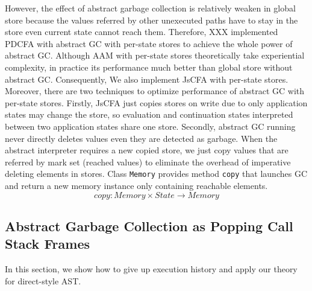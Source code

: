 \documentclass{article}
\begin{document}
However, the effect of abstract garbage collection is relatively weaken in global store because the values referred by other unexecuted paths have to stay in the store even current state cannot reach them. Therefore, XXX implemented PDCFA with abstract GC with per-state stores to achieve the whole power of abstract GC\@. Although AAM with per-state stores theoretically take experiential complexity, in practice its performance much better than global store without abstract GC\@.
Consequently, We also implement JsCFA with per-state stores. Moreover, there are two techniques to optimize performance of abstract GC with per-state stores. Firstly, JsCFA just copies stores on write due to only application states may change the store, so evaluation and continuation states interpreted between two application states share one store. Secondly, abstract GC running never directly deletes values even they are detected as garbage. When the abstract interpreter requires a new copied store, we just copy values that are referred by mark set (reached values) to eliminate the overhead of imperative deleting elements in stores.
Class \verb|Memory| provides method \verb|copy| that launches GC and return a new memory instance only containing reachable elements.
\[
copy: Memory \times State \to Memory
\]
\subsection{Abstract Garbage Collection as Popping Call Stack Frames}
\label{sub:stack-gc}
In this section, we show how to give up execution history and apply our theory for direct-style AST\@.
\end{document}
